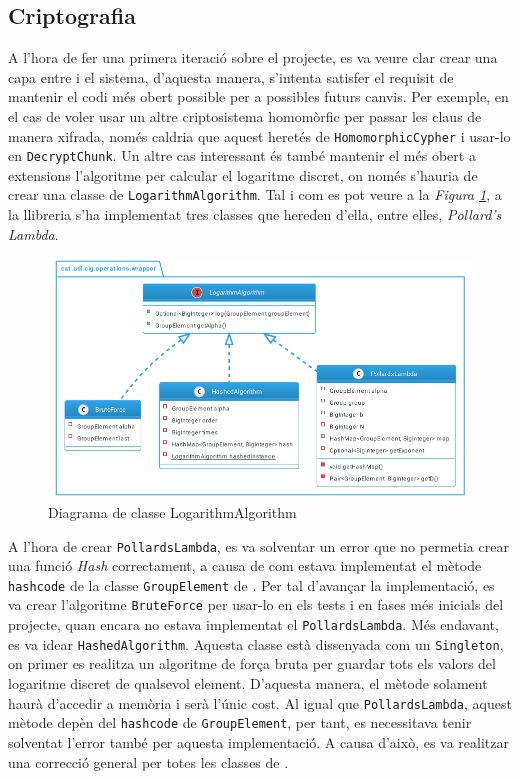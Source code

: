 \subsection{Criptografia}
A l'hora de fer una primera iteració sobre el projecte, es va veure clar crear una capa entre \ciglib i el sistema, d'aquesta manera, s'intenta satisfer el requisit de mantenir el codi més obert possible per a possibles futurs canvis. Per exemple, en el cas de voler usar un altre criptosistema homomòrfic per passar les claus de manera xifrada, només caldria que aquest heretés de \texttt{HomomorphicCypher} i usar-lo en \texttt{DecryptChunk}. Un altre cas interessant és també mantenir el més obert a extensions l'algoritme per calcular el logaritme discret, on només s'hauria de crear una classe de \texttt{LogarithmAlgorithm}. Tal i com es pot veure a la \textit{Figura \ref{fig:logarithm}}, a la llibreria \cite{ciglib} s'ha implementat tres classes que hereden d'ella, entre elles, \textit{Pollard's Lambda}.
\begin{figure}[H]
	\centering
	\includegraphics[width=16cm]{classes/log.png}
	\caption{Diagrama de classe LogarithmAlgorithm}
	\label{fig:logarithm}
\end{figure}
A l'hora de crear \texttt{PollardsLambda}, es va solventar un error que no permetia crear una funció \textit{Hash} correctament, a causa de com estava implementat el mètode \texttt{hashcode} de la classe \texttt{GroupElement} de \cite{ciglib}. Per tal d'avançar la implementació, es va crear l'algoritme \texttt{BruteForce} per usar-lo en els tests i en fases més inicials del projecte, quan encara no estava implementat el \texttt{PollardsLambda}. Més endavant, es va idear \texttt{HashedAlgorithm}. Aquesta classe està dissenyada com un \texttt{Singleton}, on primer es realitza un algoritme de força bruta per guardar tots els valors del logaritme discret de qualsevol element. D'aquesta manera, el mètode solament haurà d'accedir a memòria i serà l'únic cost. Al igual que \texttt{PollardsLambda}, aquest mètode depèn del \texttt{hashcode} de \texttt{GroupElement}, per tant, es necessitava tenir solventat l'error també per aquesta implementació. A causa d'això, es va realitzar una correcció general per totes les classes de \cite{ciglib}.
